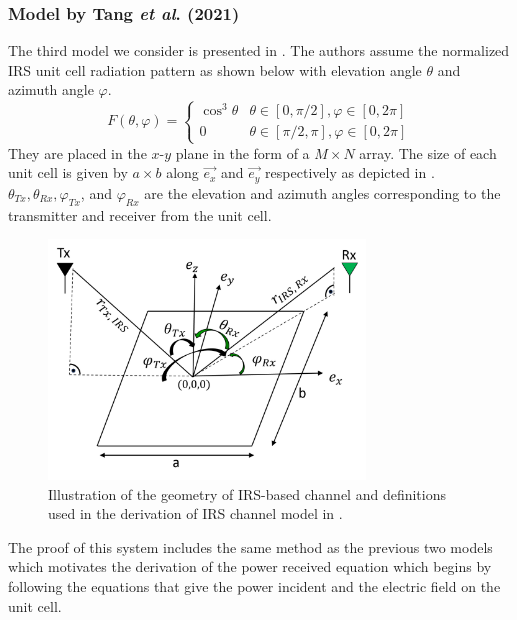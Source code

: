 \subsubsection{Model by Tang \emph{et al}. (2021) \cite{tang2020wireless}} \label{Model 3}
The third model we consider is presented in \cite{tang2020wireless}. The authors assume the normalized IRS unit cell radiation pattern as shown below with elevation angle $\theta$ and azimuth angle $\varphi$.
\begin{equation} \label{model3: Eq power radiation}
	F(\theta,\varphi)=
	\begin{cases}
		\cos^3{\theta} & \theta \in [0, \pi/2] , \varphi \in [0,2\pi]\\
		0  & \theta \in [\pi/2 ,\pi] , \varphi \in [0,2\pi]     
	\end{cases} 
\end{equation}
They are placed in the $x$-$y$ plane in the form of a $M \times N$ array. The size of each unit cell is given by $a \times b$ along $\overrightarrow{e_x}$ and $\overrightarrow{e_y}$ respectively as depicted in . $\theta_{Tx}, \theta_{Rx}, \varphi_{Tx}$, and $\varphi_{Rx}$ are the elevation and azimuth angles corresponding to the transmitter and receiver from the unit cell.
 \begin{figure}[H] %
 	\centering
 	\vspace{10pt} %
 	\includegraphics*[width=0.75\textwidth]{images/Section 2 Images/model3}
 	\caption{Illustration of the geometry of IRS-based channel and definitions used in the derivation of IRS channel model in \cite{tang2020wireless}.} 
 	\label{fig:model3} 
 \end{figure}
The proof of this system includes the same method as the previous two models which motivates the derivation of the power received equation which begins by following the equations that give the power incident and the electric field on the unit cell. 
